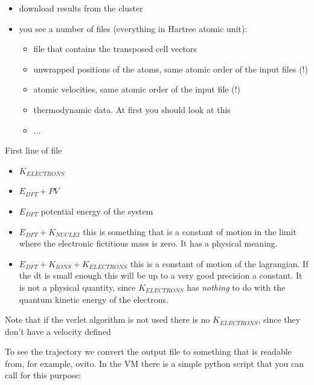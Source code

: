 \documentclass[landscape]{foils}
\begin{document}
\begin{itemize}
  \item download results from the cluster
  \item you see a number of files (everything in Hartree atomic unit):
	  \begin{itemize}
		  \item {} file that contains the transposed cell vectors
		  \item {} unwrapped positions of the atoms, same atomic order of the input files (!)
		  \item {} atomic velocities, same atomic order of the input file (!)
		  \item {} thermodynamic data. At first you should look at this
		  \item ...
	  \end{itemize}
\end{itemize}

First line of file
\begin{itemize}
	\item {} $K_{ELECTRONS}$
	\item {} $E_{DFT}+PV$ 
	\item {} $E_{DFT}$ potential energy of the system
	\item {} $E_{DFT} + K_{NUCLEI}$ this is something that is a constant of motion in the limit where the electronic fictitious mass is zero. It has a physical meaning.
	\item {} $E_{DFT} + K_{IONS} + K_{ELECTRONS}$ this is a constant of motion of the lagrangian. If the dt is small enough this will be up to a very good precision a constant. It is not a physical quantity, since $K_{ELECTRONS}$ has \emph{nothing} to do with the quantum kinetic energy of the electrons.
\end{itemize}

Note that if the verlet algorithm is not used there is no $K_{ELECTRONS}$, since they don't have a velocity defined

To see the trajectory we convert the output file to something that is readable from, for example, ovito. In the VM there is a simple python script that you can call for this purpose:
\end{document}
